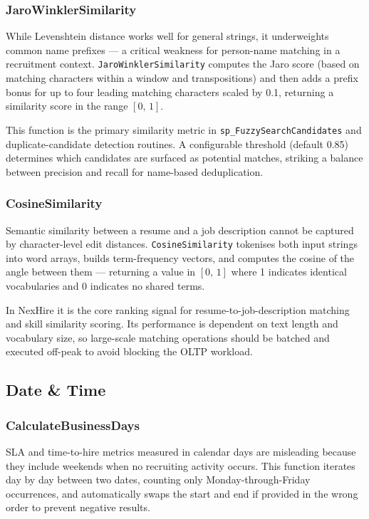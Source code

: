 \documentclass[11pt,a4paper]{article}
\begin{document}
\subsubsection{JaroWinklerSimilarity}
\noindent
While Levenshtein distance works well for general strings, it underweights common name prefixes --- a critical weakness for person-name matching in a recruitment context. \texttt{JaroWinklerSimilarity} computes the Jaro score (based on matching characters within a window and transpositions) and then adds a prefix bonus for up to four leading matching characters scaled by 0.1, returning a similarity score in the range $[0,\,1]$.

This function is the primary similarity metric in \texttt{sp\_FuzzySearchCandidates} and duplicate-candidate detection routines. A configurable threshold (default 0.85) determines which candidates are surfaced as potential matches, striking a balance between precision and recall for name-based deduplication.

\subsubsection{CosineSimilarity}
\noindent
Semantic similarity between a resume and a job description cannot be captured by character-level edit distances. \texttt{CosineSimilarity} tokenises both input strings into word arrays, builds term-frequency vectors, and computes the cosine of the angle between them --- returning a value in $[0,\,1]$ where 1 indicates identical vocabularies and 0 indicates no shared terms.

In NexHire it is the core ranking signal for resume-to-job-description matching and skill similarity scoring. Its performance is dependent on text length and vocabulary size, so large-scale matching operations should be batched and executed off-peak to avoid blocking the OLTP workload.

\subsection{Date \& Time}

\subsubsection{CalculateBusinessDays}
\noindent
SLA and time-to-hire metrics measured in calendar days are misleading because they include weekends when no recruiting activity occurs. This function iterates day by day between two dates, counting only Monday-through-Friday occurrences, and automatically swaps the start and end if provided in the wrong order to prevent negative results.
\end{document}

